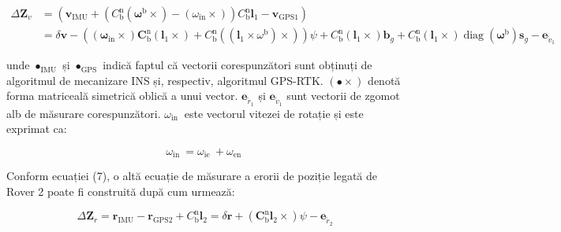 \documentclass[10pt]{report}
\begin{document}
\begin{equation}
  \begin{aligned}
    \Delta \mathbf{Z}_{v} & =\left(\boldsymbol{v}_{\mathrm{IMU}}+\left(C_{\mathrm{b}}^{\mathrm{n}}\left(\boldsymbol{\omega}^{\mathrm{b}} \times\right)-\left(\omega_{\mathrm{in}} \times\right)\right) C_{\mathrm{b}}^{\mathrm{n}} \boldsymbol{l}_{1}-\boldsymbol{v}_{\mathrm{GPS} 1}\right)                                                                                                                                                                                                                                                                                                      \\
                          & =\delta \boldsymbol{v}-\left(\left(\boldsymbol{\omega}_{\mathrm{in}} \times\right) \boldsymbol{C}_{\mathrm{b}}^{\mathrm{n}}\left(\boldsymbol{l}_{1} \times\right)+C_{\mathrm{b}}^{\mathrm{n}}\left(\left(\boldsymbol{l}_{1} \times \omega^{\mathrm{b}}\right) \times\right)\right) \psi+C_{\mathrm{b}}^{\mathrm{n}}\left(\boldsymbol{l}_{1} \times\right) \boldsymbol{b}_{g}+C_{\mathrm{b}}^{\mathrm{n}}\left(\boldsymbol{l}_{1} \times\right) \operatorname{diag}\left(\boldsymbol{\omega}^{\mathrm{b}}\right) \boldsymbol{s}_{g}-\boldsymbol{e}_{\widetilde{v}_{1}}
  \end{aligned}
\end{equation}


unde $\bullet_{\mathrm{IMU}}$ și $\bullet_{\mathrm{GPS}}$ indică faptul că vectorii corespunzători sunt obținuți de algoritmul de mecanizare INS și, respectiv, algoritmul GPS-RTK. $(\bullet \times)$ denotă forma matriceală simetrică oblică a unui vector. $\boldsymbol{e}_{\widetilde{r}_{1}}$ și $\boldsymbol{e}_{\widetilde{v}_{1}}$ sunt vectorii de zgomot alb de măsurare corespunzători. $\omega_{\text {in }}$ este vectorul vitezei de rotație și este exprimat ca:

\begin{equation}
  \omega_{\text {in }}=\omega_{\text {ie }}+\omega_{\text {en }}
\end{equation}


Conform ecuației (7), o altă ecuație de măsurare a erorii de poziție legată de Rover 2 poate fi construită după cum urmează:

\begin{equation}
  \Delta \mathbf{Z}_{r}=\boldsymbol{r}_{\mathrm{IMU}}-\boldsymbol{r}_{\mathrm{GPS} 2}+C_{\mathrm{b}}^{\mathrm{n}} \boldsymbol{l}_{2}=\delta \boldsymbol{r}+\left(\boldsymbol{C}_{\mathrm{b}}^{\mathrm{n}} \boldsymbol{l}_{2} \times\right) \psi-\boldsymbol{e}_{\widetilde{r}_{2}}
\end{equation}
\end{document}
